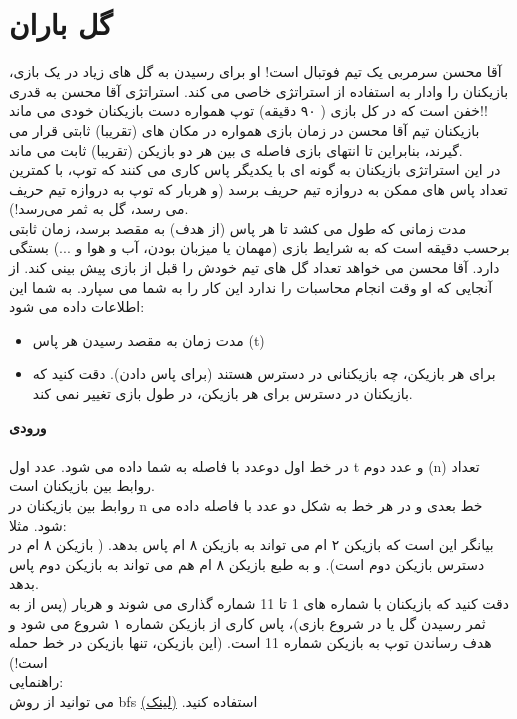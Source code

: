 \documentclass[]{article}
\begin{document}
\newpage


\section{گل باران}

آقا محسن سرمربی یک تیم فوتبال است! او برای رسیدن به گل های زیاد در یک بازی، بازیکنان را وادار به استفاده از استراتژی خاصی می کند. استراتژی آقا محسن به قدری خفن است که در کل بازی ( ۹۰ دقیقه) توپ همواره دست بازیکنان خودی می ماند!!\\
بازیکنان تیم آقا محسن در زمان بازی همواره در مکان های (تقریبا) ثابتی قرار می گیرند، بنابراین تا انتهای بازی فاصله ی بین هر دو بازیکن (تقریبا) ثابت می ماند.\\ 
در این استراتژی بازیکنان به گونه ای با یکدیگر پاس کاری می کنند که توپ، با کمترین تعداد پاس های ممکن به دروازه تیم حریف برسد (و هربار که توپ به دروازه تیم حریف می رسد، گل به ثمر می‌رسد!).\\
مدت زمانی که طول می کشد تا هر پاس (از هدف) به مقصد برسد، زمان ثابتی برحسب دقیقه است که به شرایط بازی (مهمان یا میزبان بودن، آب و هوا و ...) بستگی دارد.
آقا محسن می خواهد تعداد گل های تیم خودش را قبل از بازی پیش بینی کند. از آنجایی که او وقت انجام محاسبات را ندارد این کار را به شما می سپارد. 
به شما این اطلاعات داده می شود:
\begin{itemize}[label=$\ast$]
\item 	مدت زمان به مقصد رسیدن هر پاس (t)
\item	برای هر بازیکن، چه بازیکنانی در دسترس هستند (برای پاس دادن). دقت کنید که بازیکنان در دسترس برای هر بازیکن، در طول بازی تغییر نمی کند.\\
\end{itemize}


\textbf{ورودی}\\\\
در خط اول دوعدد با فاصله به شما داده می شود. عدد اول t و عدد دوم (n) تعداد روابط بین بازیکنان است.\\
روابط بین بازیکنان در n خط بعدی و در هر خط به شکل دو عدد با فاصله داده می شود. مثلا:
\\
بیانگر این است که بازیکن ۲ ام می تواند به بازیکن ۸ ام پاس بدهد. ( بازیکن ۸ ام در دسترس بازیکن دوم است). و به طبع بازیکن ۸ ام هم می تواند به بازیکن دوم پاس بدهد.\\
دقت کنید که بازیکنان با شماره های 1 تا 11 شماره گذاری می شوند و هربار (پس از به ثمر رسیدن گل یا در شروع بازی)، پاس کاری از بازیکن شماره ۱ شروع می شود و هدف رساندن توپ به بازیکن شماره 11 است. (این بازیکن، تنها بازیکن در خط حمله است!)\\
راهنمایی:\\ 
می توانید از روش  bfs استفاده کنید.  \href{http://www.algorithmha.ir/الگوریتم/جستجوی-اول-سطح-bfs/}{(لینک)}
\\
\end{document}
